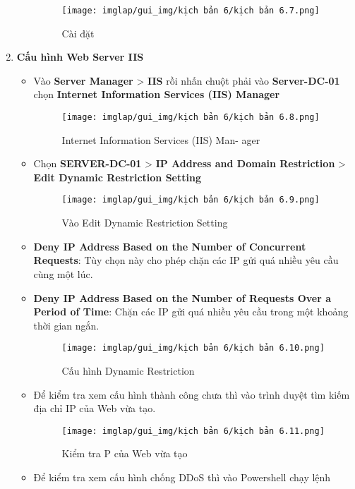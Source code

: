 \documentclass[13pt]{article}
\begin{document}
\begin{enumerate}
\begin{itemize}
\begin{figure}[H]
            \centering
            \texttt{[image: imglap/gui\_img/kịch bản 6/kịch bản 6.7.png]}
            \caption{Cài đặt}
            \label{fig:enter-label}
        \end{figure}
\newpage
\end{itemize}
        \item \textbf{Cấu hình Web Server IIS}
\begin{itemize}
    \item Vào \textbf{Server Manager} > \textbf{IIS }rồi nhấn chuột phải vào \textbf{Server-DC-01} chọn \textbf{Internet Information Services (IIS) Manager}  
\begin{figure}[H]
    \centering
    \texttt{[image: imglap/gui\_img/kịch bản 6/kịch bản 6.8.png]}
    \caption{Internet Information Services (IIS) Man-
ager}
    \label{fig:enter-label}
\end{figure}
\item Chọn \textbf{SERVER-DC-01} > \textbf{IP Address and Domain Restriction} > \textbf{Edit Dynamic Restriction Setting} 
\begin{figure}[H]
    \centering
    \texttt{[image: imglap/gui\_img/kịch bản 6/kịch bản 6.9.png]}
    \caption{Vào Edit Dynamic Restriction Setting}
    \label{fig:enter-label}
\end{figure}
\newpage
\item \textbf{Deny IP Address Based on the Number of Concurrent Requests}: Tùy chọn này cho phép chặn các IP gửi quá nhiều yêu cầu cùng một lúc.
\item  \textbf{Deny IP Address Based on the Number of Requests Over a Period of Time}: Chặn các IP gửi quá nhiều yêu cầu trong một khoảng thời gian ngắn. 
\begin{figure}[H]
    \centering
    \texttt{[image: imglap/gui\_img/kịch bản 6/kịch bản 6.10.png]}
    \caption{Cấu hình Dynamic Restriction}
    \label{fig:enter-label}
\end{figure}
\item Để kiểm tra xem cấu hình thành công chưa thì vào trình duyệt tìm kiếm địa chỉ IP của Web vừa tạo. 
\begin{figure}[H]
    \centering
    \texttt{[image: imglap/gui\_img/kịch bản 6/kịch bản 6.11.png]}
    \caption{Kiểm tra P của Web vừa tạo}
    \label{fig:enter-label}
\end{figure}
\item Để kiểm tra xem cấu hình chống DDoS thì vào Powershell chạy lệnh


\end{itemize}
\end{enumerate}
\end{document}
